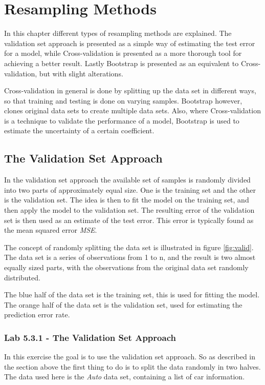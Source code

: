 \chapter{Resampling Methods}
\label{chp:crossvalidation}
In this chapter different types of resampling methods are explained. The validation set approach is presented as a simple way of estimating the test error for a model, while Cross-validation is presented as a more thorough tool for achieving a better result. Lastly Bootstrap is presented as an equivalent to Cross-validation, but with slight alterations. 

Cross-validation in general is done by splitting up the data set in different ways, so that training and testing is done on varying samples. Bootstrap however, clones original  data sets to create multiple  data sets. Also, where Cross-validation is a technique to validate the performance of a model, Bootstrap is used to estimate the uncertainty of a certain coefficient. 

\section{The Validation Set Approach}
\label{sec:VSA}
In the validation set approach the available set of samples is randomly divided into two parts of approximately equal size. One is the training set and the other is the validation set. The idea is then to fit the model on the training set, and then apply the model to the validation set. The resulting error of the validation set is then used as an estimate of the test error. This error is typically found as the mean squared error \emph{MSE}. 


The concept of randomly splitting the  data set is illustrated in figure \ref{fig:valid}. The  data set is a series of observations from 1 to n, and the result is two almost equally sized parts, with the observations from the original  data set randomly distributed. 

The blue half of the  data set is the training set, this is used for fitting the model. The orange half of the data set is the validation set, used for estimating the prediction error rate.


\subsection{Lab 5.3.1 - The Validation Set Approach}
In this exercise the goal is to use the validation set approach. So as described in the section above the first thing to do is to split the data randomly in two halves. The data used here is the \emph{Auto}  data set, containing a list of car information. 

